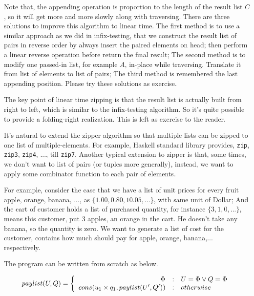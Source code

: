 \documentclass{article}
\begin{document}

Note that, the appending operation is proportion to the length of the result list $C$, so it will get
more and more slowly along with traversing. There are three solutions to improve this algorithm to
linear time. The first method is to use a similar approach as we did in infix-testing, that we construct
the result list of pairs in reverse order by always insert the paired elements on head; then perform
a linear reverse operation before return the final result; The second method is to modify one passed-in
list, for example $A$, in-place while traversing. Translate it from list of elements to list of pairs;
The third method is remembered the last appending position. Please try these solutions as exercise.

The key point of linear time zipping is that the result list is actually built from right to left, which
is similar to the infix-testing algorithm. So it's quite possible to provide a folding-right realization.
This is left as exercise to the reader.

It's natural to extend the zipper algorithm so that multiple lists can be zipped to one list of multiple-elements.
For example, Haskell standard library provides, \verb|zip|, \verb|zip3|, \verb|zip4|, ..., till \verb|zip7|.
Another typical extension to zipper is that, some times, we don't want to list of pairs (or tuples
more generally), instead, we want to apply some combinator function to each pair of elements.

For example, consider the case that we have a list of unit prices for every fruit apple, orange, banana, ...,
 as $\{1.00, 0.80, 10.05, ...\}$, with same unit of Dollar; And the cart of customer holds a list
of purchased quantity, for instance $\{3, 1, 0, ...\}$, means this customer, put 3 apples, an orange in the
cart. He doesn't take any banana, so the quantity is zero. We want to generate a list of cost for the 
customer, contains how much should pay for apple, orange, banana,... respectively.

The program can be written from scratch as below.

\[
paylist(U, Q) =  \left \{
  \begin{array}
  {r@{\quad:\quad}l}
  \Phi & U = \Phi \lor Q = \Phi \\
  cons(u_1 \times q_1, paylist(U', Q')) & otherwise
  \end{array}
\right.
\]
\end{document}
